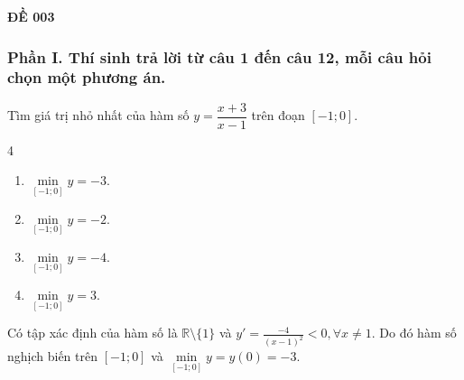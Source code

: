 \begin{center}
	\textbf{{\Huge ĐỀ 003}}
\end{center}
\subsubsection*{Phần I. Thí sinh trả lời từ câu 1 đến câu 12, mỗi câu hỏi chọn một phương án.}
\setcounter{bt}{0}
\begin{baitap}
	Tìm giá trị nhỏ nhất của hàm số $y = \dfrac{x + 3}{x - 1}$ trên đoạn $[-1;0]$.
	\begin{multicols}{4}
		\begin{enumerate}
			\item $\min\limits_{[-1;0]} y = -3$.
			\item $\min\limits_{[-1;0]} y = -2$.
			\item $\min\limits_{[-1;0]} y = -4$.
			\item $\min\limits_{[-1;0]} y = 3$.
		\end{enumerate}
	\end{multicols}
	\begin{traloi}
		Có tập xác định của hàm số là $ \mathbb{R}\setminus  \{1\}$ và $ y'=\frac{-4}{(x-1)^2} <0,\forall x\ne 1$. Do đó hàm số nghịch biến trên $ [-1;0] $ và $ \min\limits_{[-1;0]} y=y(0)= -3.$
	\end{traloi}
\end{baitap}

